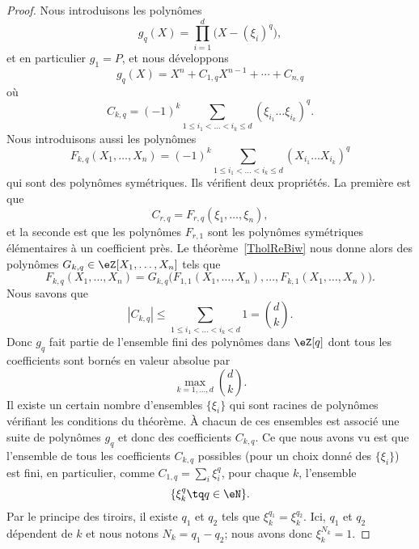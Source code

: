 \begin{proof}
	Nous introduisons les polynômes
	\begin{equation}
		g_q(X)=\prod_{i=1}^d\big( X-(\xi_i)^q \big),
	\end{equation}
	et en particulier \( g_1=P\), et nous développons
	\begin{equation}
		g_q(X)=X^n+C_{1,q}X^{n-1}+\cdots +C_{n,q}
	\end{equation}
	où
	\begin{equation}
		C_{k,q}=(-1)^k\sum_{1\leq i_1<\ldots<i_k\leq d}(\xi_{i_1}\ldots \xi_{i_k})^q.
	\end{equation}
	Nous introduisons aussi les polynômes
	\begin{equation}
		F_{k,q}(X_1,\ldots, X_n)=(-1)^k\sum_{1\leq i_1<\ldots< i_k\leq d}(X_{i_1}\ldots X_{i_k})^q
	\end{equation}
	qui sont des polynômes symétriques. Ils vérifient deux propriétés. La première est que
	\begin{equation}
		C_{r,q}=F_{r,q}(\xi_1,\ldots, \xi_n),
	\end{equation}
	et la seconde est que les polynômes \( F_{r,1}\) sont les polynômes symétriques élémentaires à un coefficient près. Le théorème~\ref{TholReBiw} nous donne alors des polynômes \( G_{k,q}\in \eZ[X_1,\ldots, X_n]\) tels que
	\begin{equation}
		F_{k,q}(X_1,\ldots, X_n)=G_{k,q}\big( F_{1,1}(X_1,\ldots, X_n),\ldots, F_{k,1}(X_1,\ldots, X_n) \big).
	\end{equation}
	Nous savons que
	\begin{equation}
		| C_{k,q} |\leq \sum_{1\leq i_1<\ldots<i_k<d}1={d\choose k}.
	\end{equation}
	Donc \( g_q\) fait partie de l'ensemble fini des polynômes dans \( \eZ[q]\) dont tous les coefficients sont bornés en valeur absolue par
	\begin{equation}
		\max_{k=1,\ldots, d}{d\choose k}.
	\end{equation}
	Il existe un certain nombre d'ensembles \( \{ \xi_i \}\) qui sont racines de polynômes vérifiant les conditions du théorème. À chacun de ces ensembles est associé une suite de polynômes \( g_q\) et donc des coefficients \( C_{k,q}\). Ce que nous avons vu est que l'ensemble de tous les coefficients \( C_{k,q}\) possibles (pour un choix donné des \( \{ \xi_i \}\)) est fini, en particulier, comme \( C_{1,q}=\sum_i\xi_i^q\), pour chaque \( k\), l'ensemble
	\begin{equation}
		\{ \xi_k^q\tq q\in \eN \}.
	\end{equation}
	Par le principe des tiroirs, il existe \( q_1\) et \( q_2\) tels que \( \xi_k^{q_1}=\xi_k^{q_2}\). Ici, \( q_1\) et \( q_2\) dépendent de \( k\) et nous notons \( N_k=q_1-q_2\); nous avons donc \( \xi_k^{N_k}=1\).


\end{proof}

